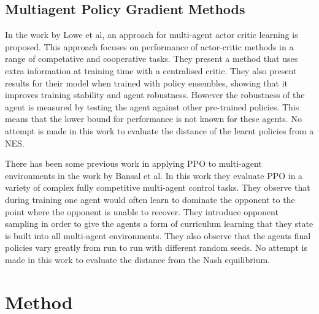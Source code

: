 \documentclass[conference]{IEEEtran}
\begin{document}

\subsection{Multiagent Policy Gradient Methods}

In the work by Lowe et al\cite{lowe2017multi}, an approach for multi-agent actor critic learning is proposed. This approach focuses on performance of actor-critic methods in a range of competative and cooperative tasks. They present a method that uses extra information at training time with a centralised critic. They also present results for their model when trained with policy ensembles, showing that it improves training stability and agent robustness. However the robustness of the agent is measured by testing the agent against other pre-trained policies. This means that the lower bound for performance is not known for these agents. No attempt is made in this work to evaluate the distance of the learnt policies from a NES.

There has been some previous work in applying PPO to multi-agent environments in the work by Bansal et al\cite{bansal2017emergent}. In this work they evaluate PPO in a variety of complex fully competitive multi-agent control tasks. They observe that during training one agent would often learn to dominate the opponent to the point where the opponent is unable to recover. They introduce opponent sampling in order to give the agents a form of curriculum learning that they state is built into all multi-agent environments. They also observe that the agents final policies vary greatly from run to run with different random seeds. No attempt is made in this work to evaluate the distance from the Nash equilibrium. 

\section{Method}
\end{document}
